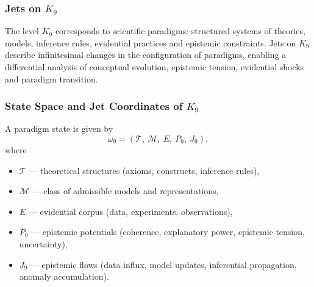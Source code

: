
\subsubsection{Jets on \texorpdfstring{$K_9$}{K_9}}
\label{sec:jets-k9}

The level $K_9$ corresponds to scientific paradigms: structured systems
of theories, models, inference rules, evidential practices and epistemic
constraints. Jets on $K_9$ describe infinitesimal changes in the
configuration of paradigms, enabling a differential analysis of
conceptual evolution, epistemic tension, evidential shocks and paradigm
transition.


\subsubsection{State Space and Jet Coordinates of \texorpdfstring{$K_9$}{K_9}}

A paradigm state is given by
\[
\omega_9 = 
(\mathcal{T},\ \mathcal{M},\ E,\ P_9,\ J_9),
\]
where
\begin{itemize}
    \item $\mathcal{T}$ — theoretical structures (axioms, constructs, 
          inference rules),
    \item $\mathcal{M}$ — class of admissible models and representations,
    \item $E$ — evidential corpus (data, experiments, observations),
    \item $P_9$ — epistemic potentials (coherence, explanatory power,
          epistemic tension, uncertainty),
    \item $J_9$ — epistemic flows (data influx, model updates,
          inferential propagation, anomaly accumulation).
\end{itemize}

